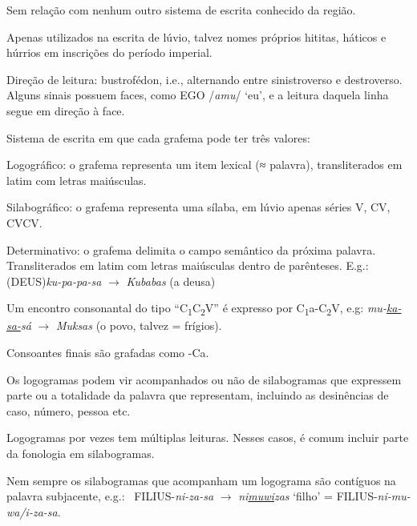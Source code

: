 \documentclass[article]{lúvio}
\begin{document}
\begin{compactitem}
	\item Sem relação com nenhum outro sistema de escrita conhecido da região.
	\item Apenas utilizados na escrita de lúvio, talvez nomes próprios hititas,
	háticos e húrrios em inscrições do período imperial.
	\item Direção de leitura: bustrofédon, i.e., alternando entre sinistroverso e
	destroverso. Alguns sinais possuem faces, como  EGO
	/\emph{amu}/ `eu', e a leitura daquela linha segue em direção à face.
	\item Sistema de escrita em que cada grafema pode ter três valores:
	\begin{compactitem}
		\item Logográfico: o grafema representa um item lexical (≈ palavra),
		transliterados em latim com letras maiúsculas.
		\item Silabográfico: o grafema representa uma sílaba, em lúvio apenas séries V,
		CV, CVCV\@.
		\item Determinativo: o grafema delimita o campo semântico da próxima
		palavra. Transliterados em latim com letras maiúsculas dentro de parênteses.
		E.g.:\  (DEUS)\emph{ku-pa-pa-sa} $\rightarrow$ \emph{Kubabas} (a deusa)
	\end{compactitem}
	\item Um encontro consonantal do tipo ``C\textsubscript{1}C\textsubscript{2}V''
	é expresso por C\textsubscript{1}a-C\textsubscript{2}V, e.g:
	 \emph{mu-\uline{ka-sa-}sá} $\rightarrow$
	\emph{Muksas} (o povo, talvez = frígios).
	\item Consoantes finais são grafadas como -Ca.
	\item Os logogramas podem vir acompanhados ou não de silabogramas que expressem
	parte ou a totalidade da palavra que representam, incluindo as desinências de
	caso, número, pessoa etc.
	\item Logogramas por vezes tem múltiplas leituras. Nesses casos, é comum incluir
	parte da fonologia em silabogramas.
	\item Nem sempre os silabogramas que acompanham um logograma são contíguos na
	palavra subjacente, e.g.:\ 
	FILIUS-\emph{ni-za-sa} $\rightarrow$ \emph{ni\uline{muwi}zas} `filho' =
	 FILIUS-\emph{ni-mu-wa/i-za-sa}.
\end{compactitem}
\end{document}
